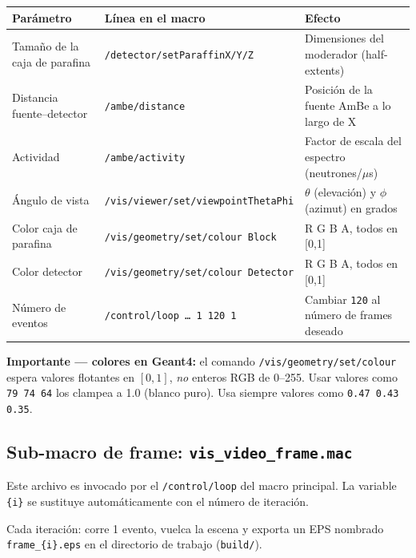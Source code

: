 \documentclass[11pt,a4paper]{article}
\begin{document}
\begin{center}
\begin{tabular}{lll}
  \toprule
  \textbf{Parámetro} & \textbf{Línea en el macro} & \textbf{Efecto} \\
  \midrule
  Tamaño de la caja de parafina & \texttt{/detector/setParaffinX/Y/Z}
    & Dimensiones del moderador (half-extents) \\
  Distancia fuente--detector  & \texttt{/ambe/distance}
    & Posición de la fuente AmBe a lo largo de X \\
  Actividad                   & \texttt{/ambe/activity}
    & Factor de escala del espectro (neutrones/$\mu$s) \\
  Ángulo de vista             & \texttt{/vis/viewer/set/viewpointThetaPhi}
    & $\theta$ (elevación) y $\phi$ (azimut) en grados \\
  Color caja de parafina      & \texttt{/vis/geometry/set/colour Block}
    & R G B A, todos en [0,1] \\
  Color detector              & \texttt{/vis/geometry/set/colour Detector}
    & R G B A, todos en [0,1] \\
  Número de eventos           & \texttt{/control/loop \ldots{} 1 120 1}
    & Cambiar \texttt{120} al número de frames deseado \\
  \bottomrule
\end{tabular}
\end{center}

\begin{advertencia}
  \textbf{Importante — colores en Geant4:} el comando
  \texttt{/vis/geometry/set/colour} espera valores flotantes en $[0,1]$,
  \emph{no} enteros RGB de 0--255.
  Usar valores como \texttt{79 74 64} los clampea a 1.0 (blanco puro).
  Usa siempre valores como \texttt{0.47 0.43 0.35}.
\end{advertencia}

\subsection{Sub-macro de frame: \texttt{vis\_video\_frame.mac}}

Este archivo es invocado por el \texttt{/control/loop} del macro principal.
La variable \texttt{\{i\}} se sustituye automáticamente con el número de iteración.



Cada iteración: corre 1 evento, vuelca la escena y exporta un EPS nombrado
\texttt{frame\_\{i\}.eps} en el directorio de trabajo (\texttt{build/}).
\end{document}
